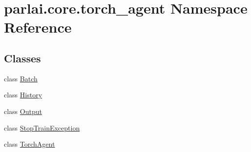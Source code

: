 \hypertarget{namespaceparlai_1_1core_1_1torch__agent}{}\section{parlai.\+core.\+torch\+\_\+agent Namespace Reference}
\label{namespaceparlai_1_1core_1_1torch__agent}
\subsection*{Classes}
\begin{DoxyCompactItemize}
\item 
class \hyperlink{classparlai_1_1core_1_1torch__agent_1_1Batch}{Batch}
\item 
class \hyperlink{classparlai_1_1core_1_1torch__agent_1_1History}{History}
\item 
class \hyperlink{classparlai_1_1core_1_1torch__agent_1_1Output}{Output}
\item 
class \hyperlink{classparlai_1_1core_1_1torch__agent_1_1StopTrainException}{Stop\+Train\+Exception}
\item 
class \hyperlink{classparlai_1_1core_1_1torch__agent_1_1TorchAgent}{Torch\+Agent}
\end{DoxyCompactItemize}
